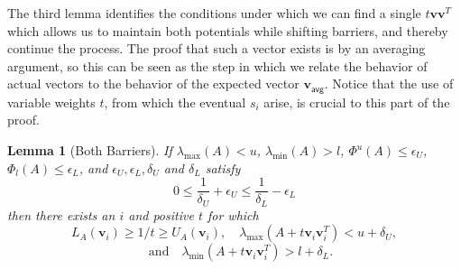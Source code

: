 \documentclass[12pt]{article}
\renewcommand{\v}{\mathbf{v}}
\newtheorem{lemma}[theorem]{Lemma}
\renewcommand{\v}{\mathbf{v}}
\newcommand{\lmin}{\lambda_\mathrm{min}}
\newcommand{\lmax}{\lambda_\mathrm{max}}
\newcommand{\deltaL}{\delta_{L}}
\newcommand{\deltaU}{\delta_{U}}
\newcommand{\epsL}{\epsilon_{L}}
\newcommand{\epsU}{\epsilon_{U}}
\newcommand\ppi{\mathbf{v}}
\begin{document}
The third lemma identifies the conditions under which we can find a single
  $t\v\v^T$ which allows us to maintain both potentials while shifting barriers, and thereby continue the
  process.
The proof that such a vector exists is by an averaging argument, so 
  this can be seen as the step in which we relate the behavior of actual vectors
  to the behavior of the expected vector $\v_\textsf{avg}$.
Notice that the use of variable weights $t$, from which the eventual
  $s_i$ arise, is crucial to this part of the proof.
\begin{lemma}[Both Barriers]\label{lem:shiftboth} 
If 
$\lmax (A) < u$, $\lmin (A) > l$,
$\Phi^u(A)\le \epsU$,
$\Phi_l(A)\le\epsL$, and $\epsU, \epsL, \deltaU$ and $\deltaL$ satisfy
\begin{equation}\label{bothcond} 0\le\frac{1}{\deltaU}+\epsU \le \frac{1}{\deltaL}-\epsL \end{equation}
then there exists an $i$ and positive $t$ for which
\[
 L_A(\ppi_{i})\geq 1/t \geq U_A(\ppi_{i}),
\quad 
\lmax (A + t \ppi_{i} \ppi_{i}^{T}) < u + \deltaU ,
\]\[\quad 
\text{and}
\quad 
\lmin (A + t \ppi_{i} \ppi_{i}^{T}) > l + \deltaL.
\]

 \end{lemma}
\end{document}
